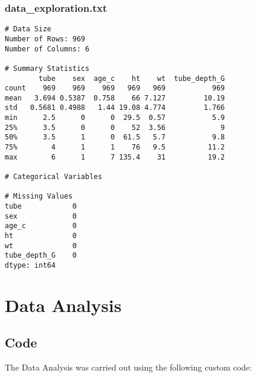 \documentclass[11pt]{article}
\begin{document}
\subsubsection*{data\_exploration.txt}

\begin{Verbatim}[tabsize=4]
# Data Size
Number of Rows: 969
Number of Columns: 6

# Summary Statistics
        tube    sex  age_c    ht    wt  tube_depth_G
count    969    969    969   969   969           969
mean   3.694 0.5387  0.758    66 7.127         10.19
std   0.5681 0.4988   1.44 19.08 4.774         1.766
min      2.5      0      0  29.5  0.57           5.9
25%      3.5      0      0    52  3.56             9
50%      3.5      1      0  61.5   5.7           9.8
75%        4      1      1    76   9.5          11.2
max        6      1      7 135.4    31          19.2

# Categorical Variables

# Missing Values
tube            0
sex             0
age_c           0
ht              0
wt              0
tube_depth_G    0
dtype: int64

\end{Verbatim}

\section{Data Analysis}
\subsection{{Code}}
The Data Analysis was carried out using the following custom code:
\end{document}
